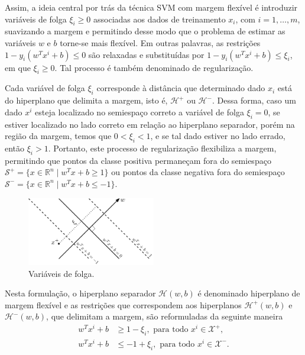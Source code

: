 \documentclass[12pt,a4paper]{scrartcl}
\def\Xset{\mathcal{X}}
\def\Hset{\mathcal{H}}
\def\RR{\mathds{R}}
\theoremstyle{definition}%
\begin{document}
Assim, a ideia central por trás da técnica SVM com margem flexível é introduzir variáveis de folga $\xi_{i} \geq 0$ associadas aos dados de treinamento $x_{i}$, com $i=1, \ldots , m$, suavizando a margem e permitindo desse modo que o problema de estimar as variáveis $w$ e $b$ torne-se mais flexível. Em outras palavras, as restrições $1-y_{i}(w^{T}x^{i} + b) \leq 0$ são relaxadas e substituídas por $1-y_{i}(w^{T}x^{i} + b) \leq \xi_{i} $, em que $\xi_{i} \geq 0$. Tal processo é também denominado de regularização.

Cada variável de folga $\xi_{i}$ corresponde à distância que determinado dado $x_{i}$ está do hiperplano que delimita a margem, isto é, $\Hset^{+}$ ou $\Hset^{-}$. Dessa forma, caso um dado $x^{i}$ esteja localizado no semiespaço correto a variável de folga $\xi_{i} = 0$, se estiver localizado no lado correto em relação ao hiperplano separador, porém na região da margem, temos que $0< \xi_{i} < 1$, e se tal dado estiver no lado errado, então $\xi_{i} >1$. Portanto, este processo de regularização flexibiliza a margem, permitindo que pontos da classe positiva permaneçam fora do semiespaço $\mathcal{S}^{+}=\{x\in \RR^n \mid w^{T}x+b\geq 1\}$ ou pontos da classe negativa fora do semiespaço $\mathcal{S}^{-}=\{x\in \RR^n \mid w^{T}x+b\leq -1\}$.

\begin{figure}[!ht] 
	\centering
	\includegraphics[width=0.50\textwidth]{variaveis_de_folga}
	\caption{Variáveis de folga. \label{fig:variaveis_de_folga}}
\end{figure}

Nesta formulação, o hiperplano separador $\Hset(w,b)$ é denominado hiperplano de margem flexível e as restrições que correspondem aos hiperplanos $\Hset^{+} (w,b)$ e $\Hset^{-} (w,b)$, que delimitam a margem, são reformuladas da seguinte maneira 
\begin{align}
w^{T}x^{i}+b &\geq 1 - \xi_{i} , \text{ para  todo } x^{i} \in \Xset^{+}, \label{restricoesCSVM+} \\
w^{T}x^{i}+b &\leq -1 +\xi_{i} , \text{ para  todo } x^{i} \in \Xset^{-}. \label{restricoesCSVM-}
\end{align}
\end{document}
